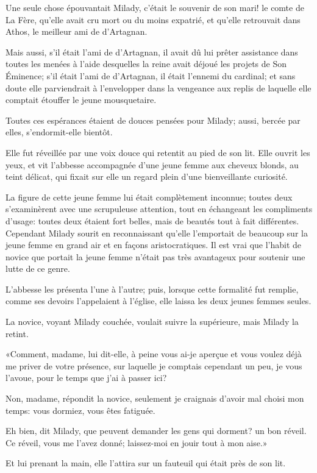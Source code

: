 Une seule chose épouvantait Milady, c'était le souvenir de son mari! le comte de La Fère, qu'elle avait cru mort ou du moins expatrié, et qu'elle retrouvait dans Athos, le meilleur ami de d'Artagnan. 

Mais aussi, s'il était l'ami de d'Artagnan, il avait dû lui prêter assistance dans toutes les menées à l'aide desquelles la reine avait déjoué les projets de Son Éminence; s'il était l'ami de d'Artagnan, il était l'ennemi du cardinal; et sans doute elle parviendrait à l'envelopper dans la vengeance aux replis de laquelle elle comptait étouffer le jeune mousquetaire. 

Toutes ces espérances étaient de douces pensées pour Milady; aussi, bercée par elles, s'endormit-elle bientôt. 

Elle fut réveillée par une voix douce qui retentit au pied de son lit. Elle ouvrit les yeux, et vit l'abbesse accompagnée d'une jeune femme aux cheveux blonds, au teint délicat, qui fixait sur elle un regard plein d'une bienveillante curiosité. 

La figure de cette jeune femme lui était complètement inconnue; toutes deux s'examinèrent avec une scrupuleuse attention, tout en échangeant les compliments d'usage: toutes deux étaient fort belles, mais de beautés tout à fait différentes. Cependant Milady sourit en reconnaissant qu'elle l'emportait de beaucoup sur la jeune femme en grand air et en façons aristocratiques. Il est vrai que l'habit de novice que portait la jeune femme n'était pas très avantageux pour soutenir une lutte de ce genre. 

L'abbesse les présenta l'une à l'autre; puis, lorsque cette formalité fut remplie, comme ses devoirs l'appelaient à l'église, elle laissa les deux jeunes femmes seules. 

La novice, voyant Milady couchée, voulait suivre la supérieure, mais Milady la retint. 

«Comment, madame, lui dit-elle, à peine vous ai-je aperçue et vous voulez déjà me priver de votre présence, sur laquelle je comptais cependant un peu, je vous l'avoue, pour le temps que j'ai à passer ici? 

\speak  Non, madame, répondit la novice, seulement je craignais d'avoir mal choisi mon temps: vous dormiez, vous êtes fatiguée. 

\speak  Eh bien, dit Milady, que peuvent demander les gens qui dorment? un bon réveil. Ce réveil, vous me l'avez donné; laissez-moi en jouir tout à mon aise.» 

Et lui prenant la main, elle l'attira sur un fauteuil qui était près de son lit. 

